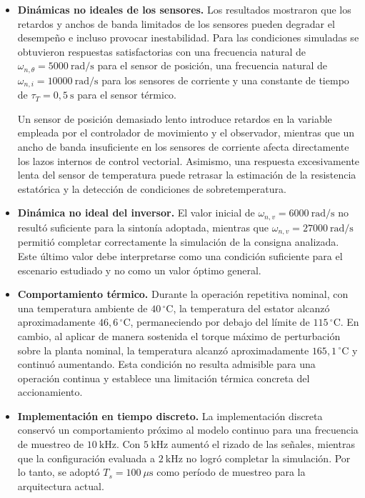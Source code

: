 \documentclass[10pt,a4paper]{article}
\begin{document}
\begin{itemize}
	\item \textbf{Dinámicas no ideales de los sensores.}
	Los resultados mostraron que los retardos y anchos de banda limitados de
	los sensores pueden degradar el desempeño e incluso provocar inestabilidad.
	Para las condiciones simuladas se obtuvieron respuestas satisfactorias con
	una frecuencia natural de
	$\omega_{n,\theta}=5000~\mathrm{rad/s}$ para el sensor de posición, una
	frecuencia natural de
	$\omega_{n,i}=10000~\mathrm{rad/s}$ para los sensores de corriente y una
	constante de tiempo de
	$\tau_T=0{,}5~\mathrm{s}$ para el sensor térmico.
	
	Un sensor de posición demasiado lento introduce retardos en la variable
	empleada por el controlador de movimiento y el observador, mientras que un
	ancho de banda insuficiente en los sensores de corriente afecta
	directamente los lazos internos de control vectorial. Asimismo, una
	respuesta excesivamente lenta del sensor de temperatura puede retrasar la
	estimación de la resistencia estatórica y la detección de condiciones de
	sobretemperatura.
	
	\item \textbf{Dinámica no ideal del inversor.}
	El valor inicial de
	$\omega_{n,v}=6000~\mathrm{rad/s}$ no resultó suficiente para la sintonía
	adoptada, mientras que
	$\omega_{n,v}=27000~\mathrm{rad/s}$ permitió completar correctamente la
	simulación de la consigna analizada. Este último valor debe interpretarse
	como una condición suficiente para el escenario estudiado y no como un
	valor óptimo general.
	
	\item \textbf{Comportamiento térmico.}
	Durante la operación repetitiva nominal, con una temperatura ambiente de
	$40\,^{\circ}\mathrm{C}$, la temperatura del estator alcanzó
	aproximadamente $46{,}6\,^{\circ}\mathrm{C}$, permaneciendo por debajo del
	límite de $115\,^{\circ}\mathrm{C}$. En cambio, al aplicar de manera
	sostenida el torque máximo de perturbación sobre la planta nominal, la
	temperatura alcanzó aproximadamente $165{,}1\,^{\circ}\mathrm{C}$ y
	continuó aumentando. Esta condición no resulta admisible para una operación
	continua y establece una limitación térmica concreta del accionamiento.
	
	\item \textbf{Implementación en tiempo discreto.}
	La implementación discreta conservó un comportamiento próximo al modelo
	continuo para una frecuencia de muestreo de $10~\mathrm{kHz}$. Con
	$5~\mathrm{kHz}$ aumentó el rizado de las señales, mientras que la
	configuración evaluada a $2~\mathrm{kHz}$ no logró completar la simulación.
	Por lo tanto, se adoptó
	$T_s=100~\mu\mathrm{s}$ como período de muestreo para la arquitectura
	actual.
\end{itemize}
\end{document}
